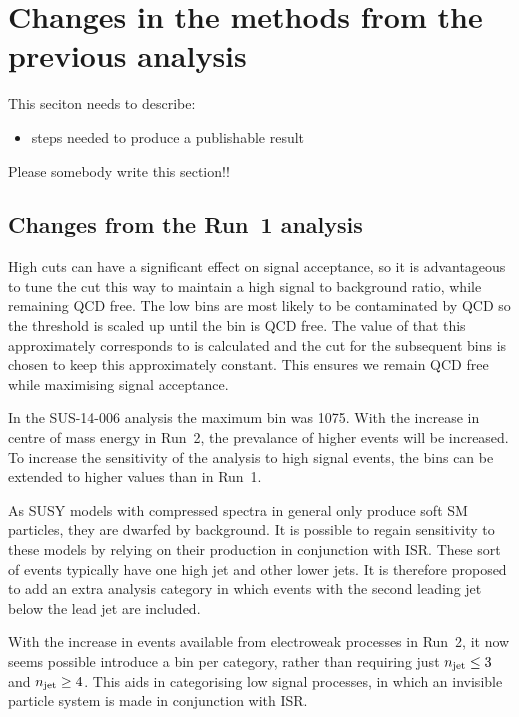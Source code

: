 \section{Changes in the methods from the previous analysis}
\label{sec:strategy}


This seciton needs to describe:

\begin{itemize}
 \item steps needed to produce a publishable result
\end{itemize}

Please somebody write this section!!


\subsection{Changes from the Run~1 analysis}

High \alphat cuts can have a significant effect on signal acceptance, so it is
advantageous to tune the cut this way to maintain a high signal to background
ratio, while remaining QCD free. The low \HT bins are most likely to be 
contaminated by QCD so the \alphat threshold 
is scaled up until the bin is QCD free. The value of \mht that this
approximately corresponds to is calculated and the \alphat cut for the
subsequent bins is chosen to keep this \mht approximately constant. This ensures
we remain QCD free while maximising signal acceptance.

In the SUS-14-006 analysis the maximum \HT bin was 1075. With the increase in
centre of mass energy in Run~2, the prevalance of higher \HT events will be
increased. To increase the sensitivity
of the analysis to high \HT signal events, the \HT bins can be extended to higher
values than in Run~1.

As SUSY models with compressed spectra in general only produce soft SM
particles, they are dwarfed by background. It is possible to regain sensitivity
to these models by relying on their production in conjunction with ISR. These
sort of events typically have one high \PT jet and other lower \PT jets. It is
therefore proposed to add an extra analysis category in which events with the
second leading jet below the lead jet are included.

With the increase in events available from electroweak processes in Run~2, it
now seems possible introduce a bin per \njet category, rather than requiring
just $n_{\text{jet}} \leq 3$ and $n_{\text{jet}} \geq 4$. This aids in categorising low \njet signal
processes, in which an invisible particle system is made in conjunction with ISR.
